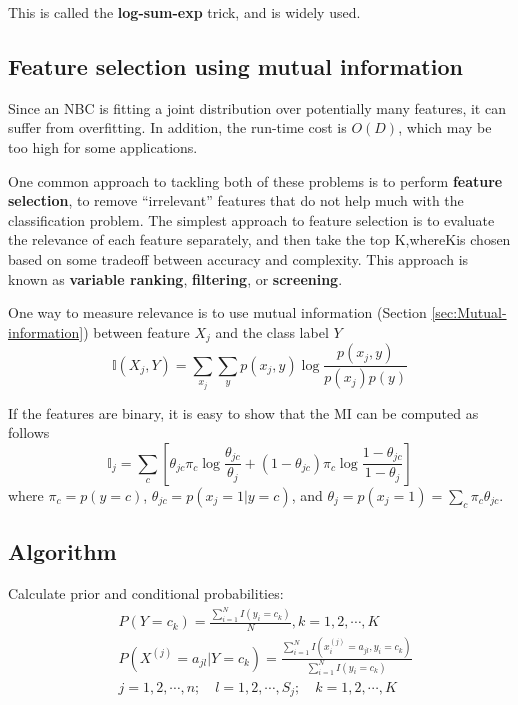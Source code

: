 \begin{refsection}
This is called the \textbf{log-sum-exp} trick, and is widely used. 


\subsection{Feature selection using mutual information}
Since an NBC is fitting a joint distribution over potentially many features, it can suffer from overfitting. In addition, the run-time cost is $O(D)$, which may be too high for some applications. 

One common approach to tackling both of these problems is to perform \textbf{feature selection}, to remove “irrelevant” features that do not help much with the classification problem. The simplest approach to feature selection is to evaluate the relevance of each feature separately, and then take the top K,whereKis chosen based on some tradeoff between accuracy and complexity. This approach is known as \textbf{variable ranking}, \textbf{filtering}, or \textbf{screening}.

One way to measure relevance is to use mutual information (Section \ref{sec:Mutual-information}) between feature $X_j$ and the class label $Y$
\begin{equation}
\mathbb{I}(X_j,Y)=\sum\limits_{x_j}{\sum\limits_{y}{p(x_j,y)\log \dfrac{p(x_j,y)}{p(x_j)p(y)}}}
\end{equation}

If the features are binary, it is easy to show that the MI can be computed as follows
\begin{equation}
\mathbb{I}_j = \sum\limits_c \left[\theta_{jc}\pi_c\log{\dfrac{\theta_{jc}}{\theta_j}}+(1-\theta_{jc})\pi_c\log{\dfrac{1-\theta_{jc}}{1-\theta_j}}\right]
\end{equation}
where $\pi_c=p(y=c)$, $\theta_{jc}=p(x_j=1|y=c)$, and $\theta_j=p(x_j=1)=\sum_{c} \pi_c\theta_{jc}$.

\subsection{Algorithm}

	\begin{algorithm}[H]
	\SetAlgoLined
	
	Calculate prior and conditional probabilities:
\begin{align*} 
&P\left(Y=c_{k}\right)=\frac{\sum_{i=1}^{N} I\left(y_{i}=c_{k}\right)}{N}, k=1,2, \cdots, K \\
& P\left(X^{(j)}=a_{j l} | Y=c_{k}\right)=\frac{\sum_{i=1}^{N} I\left(x_{i}^{(j)}=a_{j l}, y_{i}=c_{k}\right)}{\sum_{i=1}^{N} I\left(y_{i}=c_{k}\right)}  \\
&  j=1,2, \cdots, n ; \quad l=1,2, \cdots, S_{j} ; \quad k=1,2, \cdots, K 
\end{align*}
	

\end{algorithm}
\end{refsection}
